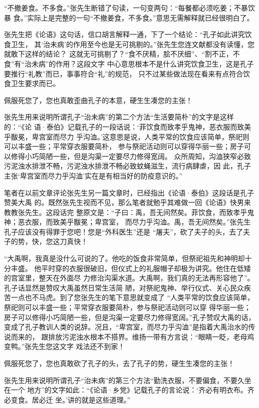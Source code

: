 “不撤姜食。不多食。”张先生断错了句读，一句变两句：“每餐都必须吃姜；不暴饮暴
食。”实际上是完整的一句“不撤姜食，不多食。”意思无需解释就已经很明白了。

张先生把《论语》这句话，信口胡言解释一通，下了一个结论：“孔子如此讲究饮食卫生，
其‘治未病’的作用至今也是无可挑剔的。”张先生您连文献都没有读懂，您就敢下这样的结论？
这就无可挑剔了？“食不厌精，脍不厌细”、“割不正，不食”有“治未病”的作用？这段文字
中心意思根本不是什么讲究饮食卫生，这是孔子要推行“礼教”而已，事事符合“礼”的规范，
只不过某些做法现在看来有点符合饮食卫生要求而已。

佩服死您了，您也真敢歪曲孔子的本意，硬生生凑您的主张！

张先生用来说明所谓孔子“治未病”的第二个方法“生活要简朴”的文字是这样的：“《论
语·泰伯》记载孔子的一段话说：‘菲饮食而致孝乎鬼神，恶衣服而致美乎黻冕，卑宫室而尽力
乎沟洫。’这意思是说，人类平常的饮食应该简单，祭祀则可以丰盛一些；平常穿衣服要简朴，
参与祭祀活动则可以穿得华丽一些；房子可以修得小巧简陋一些，但是沟渠一定要尽力修得宽阔。
众所周知，沟洫狭窄必致污泥浊水排泄不畅，污泥浊水排泄不畅必致蚊蝇滋生，流行病肆虐，因
此，孔子主张‘卑宫室而尽力乎沟洫’实在是有相当好的防疫意识的。”

笔者在以前文章评论张先生另一篇文章时，已经指出《论语·泰伯》这段话是孔子赞美大禹
的。既然张先生视而不见，那么笔者就勉乎其难做一回《论语》快男来教教张先生。这段话完
整原文是：“子曰：禹，吾无间然矣。菲饮食，而致孝乎鬼神；恶衣服，而致美乎黻冕；卑宫室，
而尽力乎沟洫。禹，吾无间然矣。”张先生孔子应该没有得罪于您吧！您是“外科医生”还是
“屠夫”，砍了夫子的头，去了夫子的势，快，您这刀真快！

“大禹啊，我真是没什么可说的了。他吃的饭食非常简单，但祭祀祖先和神明却十分丰盛。
他平时穿的衣服很破旧，但仪式上的礼服帽子却极为讲究。他住在低矮的宫室里，整天在外面尽
力修治沟渠水道。大禹啊，我们真的无法再形容他了”。孔子话显然是赞叹大禹虽然日常生活简
陋，对祭祀鬼神、举行仪式、关心民众疾苦一点也不马虎。到了您张先生的笔下意思就变成了
“人类平常的饮食应该简单，祭祀则可以丰盛一些；平常穿衣服要简朴，参与祭祀活动则可以穿
得华丽一些；房子可以修得小巧简陋一些，但是沟渠一定要尽力修得宽阔。”孔子赞叹大禹的话，
变成了孔子教训人类的说辞。况且，“卑宫室，而尽力乎沟洫”是指着大禹治水的传说而来的，
跟排放污泥浊水根本不搭界。维扬一带有方言说：“眼睛一眨，老母鸡变鸭。”张先生您这文字
戏法还不到家！

佩服死您了，您也真敢砍了孔子的头，去了孔子的势，硬生生凑您的主张！

张先生用来说明所谓孔子“治未病”的第三个方法“勤洗衣服，不要偏食，不要久坐在一个
地方”的文字如此：“《论语·乡党》记载孔子的言论说：‘齐必有明衣布。齐必变食。居必迁
坐。’讲的就是这些道理。”

